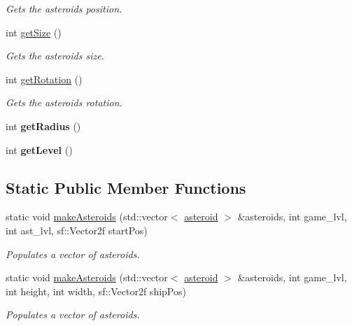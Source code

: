 \begin{DoxyCompactItemize}
\begin{DoxyCompactList}\small\item\em Gets the asteroid\textquotesingle{}s position. \end{DoxyCompactList}\item 
\mbox{\label{classasteroid_a31381ad6b2d162784477cc3554d6aa1c}} 
int \hyperlink{classasteroid_a31381ad6b2d162784477cc3554d6aa1c}{get\+Size} ()
\begin{DoxyCompactList}\small\item\em Gets the asteroid\textquotesingle{}s size. \end{DoxyCompactList}\item 
\mbox{\label{classasteroid_a9231521c81815f9adc07824458d3cc6a}} 
int \hyperlink{classasteroid_a9231521c81815f9adc07824458d3cc6a}{get\+Rotation} ()
\begin{DoxyCompactList}\small\item\em Gets the asteroid\textquotesingle{}s rotation. \end{DoxyCompactList}\item 
\mbox{\label{classasteroid_a308badbe0f03fb0df7f1ae6a15699908}} 
int {\bfseries get\+Radius} ()
\item 
\mbox{\label{classasteroid_ad716a24a04f4e8a34c5a9ecf957c8500}} 
int {\bfseries get\+Level} ()
\end{DoxyCompactItemize}
\subsection*{Static Public Member Functions}
\begin{DoxyCompactItemize}
\item 
\mbox{\label{classasteroid_a593caeecce45a2a32e2610478480ba53}} 
static void \hyperlink{classasteroid_a593caeecce45a2a32e2610478480ba53}{make\+Asteroids} (std\+::vector$<$ \hyperlink{classasteroid}{asteroid} $>$ \&asteroids, int game\+\_\+lvl, int ast\+\_\+lvl, sf\+::\+Vector2f start\+Pos)
\begin{DoxyCompactList}\small\item\em Populates a vector of asteroids. \end{DoxyCompactList}\item 
\mbox{\label{classasteroid_ae1eb6faff764e75af220fb1f6ee19b38}} 
static void \hyperlink{classasteroid_ae1eb6faff764e75af220fb1f6ee19b38}{make\+Asteroids} (std\+::vector$<$ \hyperlink{classasteroid}{asteroid} $>$ \&asteroids, int game\+\_\+lvl, int height, int width, sf\+::\+Vector2f ship\+Pos)
\begin{DoxyCompactList}\small\item\em Populates a vector of asteroids. \end{DoxyCompactList}\end{DoxyCompactItemize}


